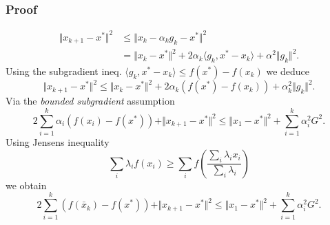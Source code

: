 \documentclass{beamer}
\begin{document}
\begin{frame}
  \frametitle{Proof}
  \vspace{-0.5cm}
  \begin{equation}
    \begin{aligned}
      \Vert x_{k+1} - x^* \Vert^2 &\le \Vert x_k - \alpha_k g_k - x^* \Vert^2 \\
      &= \Vert x_k-x^* \Vert^2 + 2 \alpha_k \langle g_k, x^*-x_k \rangle + \alpha^2 \Vert g_k \Vert^2.
    \end{aligned}
  \end{equation}
  Using the subgradient ineq. $\langle g_k , x^* -x_k \rangle \le f(x^*) - f(x_k)$
  we deduce
  \begin{equation}
    \Vert x_{k+1} - x^* \Vert^2 \le \Vert x_k-x^* \Vert^2 + 2 \alpha_k(f(x^*) - f(x_k)) + \alpha_k^2 \Vert g_k \Vert^2.
  \end{equation}
  Via the \emph{bounded subgradient} assumption
  \begin{equation}
    2\sum_{i=1}^{k}  \alpha_i(f(x_i) - f(x^*)) + \Vert x_{k+1} - x^* \Vert^2 \le \Vert x_1-x^* \Vert^2 +  \sum_{i=1}^{k} \alpha_i^2 G^2.
  \end{equation}
  Using Jensens inequality %
  \begin{equation}
    \sum_{i} \lambda_i f(x_i) \ge \sum_{i} f \left( \frac{\sum_{i} \lambda_i x_i}{\sum_{i}\lambda_i} \right)
  \end{equation}
  we obtain
  \begin{equation}
    2\sum_{i=1}^{k}  (f(\bar{x}_k) - f(x^*)) + \Vert x_{k+1} - x^* \Vert^2 \le \Vert x_1-x^* \Vert^2 +  \sum_{i=1}^{k} \alpha_i^2 G^2.
  \end{equation}

\end{frame}
\end{document}
